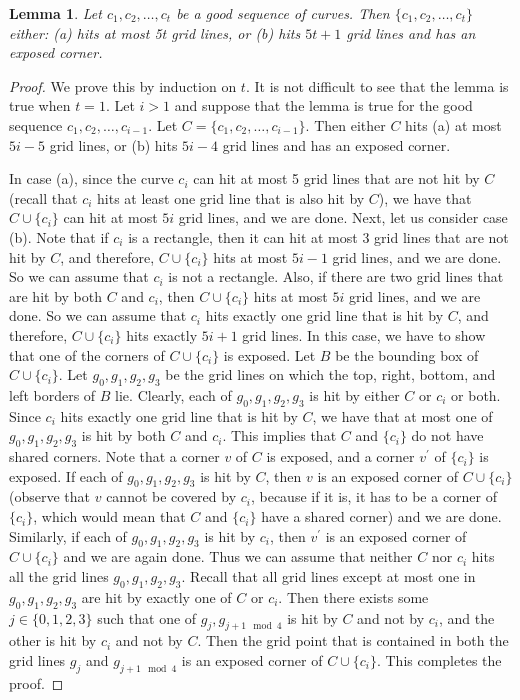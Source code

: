 \documentclass[
final
]{dmtcs-episciences}
\numberwithin{equation}{subsection}
\newtheorem{lem}[defn]{Lemma}%
\begin{document}
\begin{lem}
	Let $c_1, c_2,\ldots , c_t$ be a good sequence of curves. Then $\{ c_1, c_2, \ldots , c_t \}$ either: (a) hits at most 5t grid lines, or (b) hits $5t+1$ grid lines and has an exposed corner.
	\label{lem:orthoconvex}
\end{lem}
\begin{proof}
	We prove this by induction on $t$. It is not difficult to see that the lemma is true when $t = 1$. Let $i > 1$ and suppose that the lemma is true for the good sequence $c_1, c_2,\ldots , c_{i-1}$. Let $C = \{ c_1, c_2, \ldots , c_{i-1} \}$. Then either $C$ hits (a) at most $5i-5$ grid lines, or (b) hits $5i-4$ grid lines and has an exposed corner. 
	
	\medskip		
	
	In case (a), since the curve $c_i$ can hit at most 5 grid lines that are not hit by $C$ (recall that $c_i$ hits at least one grid line that is also hit by $C$), we have that $C \cup \{ c_i \}$ can hit at most $5i$ grid lines, and we are done. Next, let us consider case (b). Note that if $c_i$ is a rectangle, then it can hit at most 3 grid lines that are not hit by $C$, and therefore, $C \cup \{ c_i \}$ hits at most $5i - 1$ grid lines, and we are done. So we can assume that $c_i$ is not a rectangle. Also, if there are two grid lines that are hit by both $C$ and $c_i$, then $C \cup \{ c_i \}$ hits at most $5i$ grid lines, and we are done. So we can assume that $c_i$ hits exactly one grid line that is hit by $C$, and therefore, $C \cup \{ c_i \}$ hits exactly $5i+1$ grid lines. In this case, we have to show that one of the corners of $C \cup \{ c_i \}$ is exposed. Let $B$ be the bounding box of $C \cup \{ c_i \}$. Let $g_0, g_1, g_2, g_3$ be the grid lines on which the top, right, bottom, and left borders of $B$ lie. Clearly, each of $g_0, g_1, g_2, g_3$ is hit by either $C$ or $c_i$ or both. Since $c_i$ hits exactly one grid line that is hit by $C$, we have that at most one of $g_0, g_1, g_2, g_3$ is hit by both $C$ and $c_i$. This implies that $C$ and $\{ c_i \}$ do not have shared corners. Note that a corner $v$ of $C$ is exposed, and a corner $v^\prime$ of $\{ c_i \}$ is exposed. If each of $g_0, g_1, g_2, g_3$ is hit by $C$, then $v$ is an exposed corner of $C \cup \{ c_i \}$ (observe that $v$ cannot be covered by $c_i$, because if it is, it has to be a corner of $\{ c_i \}$, which would mean that $C$ and $\{ c_i \}$ have a shared corner) and we are done. Similarly, if each of $g_0, g_1, g_2, g_3$ is hit by $c_i$, then $v^\prime$ is an exposed corner of $C \cup \{ c_i \}$ and we are again done. Thus we can assume that neither $C$ nor $c_i$ hits all the grid lines $g_0, g_1, g_2, g_3$. Recall that all grid lines except at most one in $g_0, g_1, g_2, g_3$ are hit by exactly one of $C$ or $c_i$. Then there exists some $j \in \{0,1,2,3\}$ such that one of $g_j, g_{j+1 \mod 4}$ is hit by $C$ and not by $c_i$, and the other is hit by $c_i$ and not by $C$. Then the grid point that is contained in both the grid lines $g_j$ and $g_{j+1 \mod 4}$ is an exposed corner of $C \cup \{ c_i \}$. This completes the proof.
\end{proof}
\end{document}
